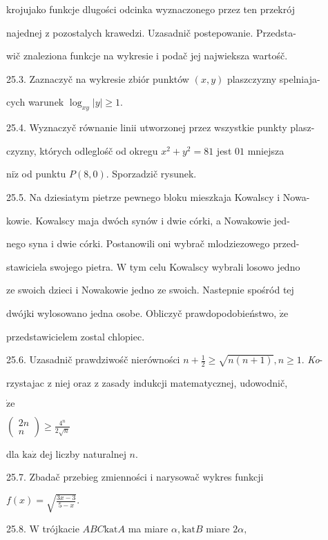 \documentclass[a4paper,12pt]{article}
\begin{document}
krojujako funkcje dlugości odcinka wyznaczonego przez ten przekrój

najednej $\mathrm{z}$ pozostalych krawedzi. Uzasadnič postepowanie. Przedsta-

wič znaleziona funkcje na wykresie $\mathrm{i}$ podač jej najwieksza wartośč.

25.3. Zaznaczyč na wykresie zbiór punktów $(x,y)$ plaszczyzny spelniaja-

cych warunek $\log_{xy}|y|\geq 1.$

25.4. Wyznaczyč równanie linii utworzonej przez wszystkie punkty plasz-

czyzny, których odleglośč od okregu $x^{2}+y^{2}=81$ jest $01$ mniejsza

$\mathrm{n}\mathrm{i}\dot{\mathrm{z}}$ od punktu $P(8,0)$. Sporzadzič rysunek.

25.5. Na dziesiatym pietrze pewnego bloku mieszkaja Kowalscy $\mathrm{i}$ Nowa-

kowie. Kowalscy maja dwóch synów $\mathrm{i}$ dwie córki, a Nowakowie jed-

nego syna $\mathrm{i}$ dwie córki. Postanowili oni wybrač mlodziezowego przed-

stawiciela swojego pietra. $\mathrm{W}$ tym celu Kowalscy wybrali losowo jedno

ze swoich dzieci $\mathrm{i}$ Nowakowie jedno ze swoich. Nastepnie spośród tej

dwójki wylosowano jedna osobe. Obliczyč prawdopodobieństwo, $\dot{\mathrm{z}}\mathrm{e}$

przedstawicielem zostal chlopiec.

25.6. Uzasadnič prawdziwośč nierówności $n+\displaystyle \frac{1}{2}\geq\sqrt{n(n+1)}, n\geq 1.$ {\it Ko}-

rzystajac $\mathrm{z}$ niej oraz $\mathrm{z}$ zasady indukcji matematycznej, udowodnič,

$\dot{\mathrm{z}}\mathrm{e}$

$\displaystyle \left(\begin{array}{l}
2n\\
n
\end{array}\right)\geq\frac{4^{n}}{2\sqrt{n}}$

dla $\mathrm{k}\mathrm{a}\dot{\mathrm{z}}$ dej liczby naturalnej $n.$

25.7. Zbadač przebieg zmienności $\mathrm{i}$ narysowač wykres funkcji

$f(x)=\sqrt{\frac{3x-3}{5-x}}.$

25.8. $\mathrm{W}$ trójkacie $ABC \mathrm{k}\mathrm{a}\mathrm{t} A$ ma miare $\alpha, \mathrm{k}\mathrm{a}\mathrm{t} B$ miare $2\alpha,$
\end{document}
